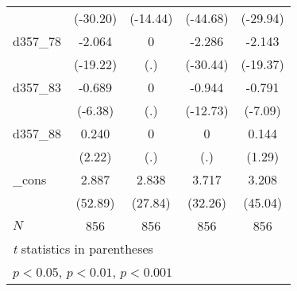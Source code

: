 {\begin{tabular}{l*{4}{c}}
            &    (-30.20)         &    (-14.44)         &    (-44.68)         &    (-29.94)         \\
[1em]
d357\_78     &      -2.064\sym{***}&           0         &      -2.286\sym{***}&      -2.143\sym{***}\\
            &    (-19.22)         &         (.)         &    (-30.44)         &    (-19.37)         \\
[1em]
d357\_83     &      -0.689\sym{***}&           0         &      -0.944\sym{***}&      -0.791\sym{***}\\
            &     (-6.38)         &         (.)         &    (-12.73)         &     (-7.09)         \\
[1em]
d357\_88     &       0.240\sym{*}  &           0         &           0         &       0.144         \\
            &      (2.22)         &         (.)         &         (.)         &      (1.29)         \\
[1em]
\_cons      &       2.887\sym{***}&       2.838\sym{***}&       3.717\sym{***}&       3.208\sym{***}\\
            &     (52.89)         &     (27.84)         &     (32.26)         &     (45.04)         \\
\hline
\(N\)       &         856         &         856         &         856         &         856         \\
\hline\hline
\multicolumn{5}{l}{\footnotesize \textit{t} statistics in parentheses}\\
\multicolumn{5}{l}{\footnotesize \sym{*} \(p<0.05\), \sym{**} \(p<0.01\), \sym{***} \(p<0.001\)}\\
\end{tabular}
}
